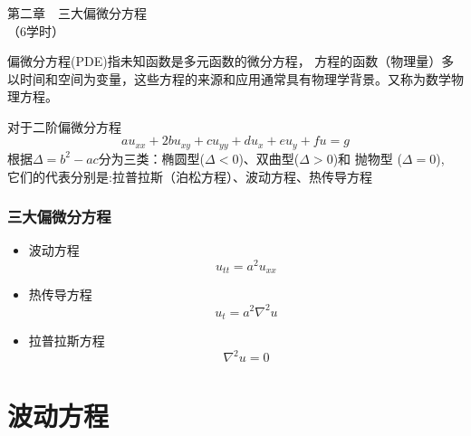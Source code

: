 	\begin{frame}
		\frametitle{}
	    \begin{center}
		{ {\Huge 第二章~~三大偏微分方程\\（6学时）}}
	    \end{center}    
	\end{frame}

\begin{frame}
	\begin{definition}[] 
	偏微分方程(PDE)指未知函数是多元函数的微分方程，
	方程的函数（物理量）多以时间和空间为变量，这些方程的来源和应用通常具有物理学背景。又称为数学物理方程。
	\end{definition}
	对于二阶偏微分方程
	\begin{equation*}
		au_{xx}+2bu_{xy}+cu_{yy}+du_x+eu_y+fu=g
	\end{equation*}
	根据$\Delta=b^2-ac$分为三类：椭圆型($\Delta<0$)、双曲型($\Delta>0$)和 抛物型 ($\Delta=0$),\\
	它们的代表分别是:拉普拉斯（泊松方程）、波动方程、热传导方程
\end{frame}

\begin{frame}
\frametitle{三大偏微分方程}
	\begin{itemize}
	\item  波动方程 
	\begin{equation*}
		u_{tt}=a^2u_{xx}
	\end{equation*}
	\item  热传导方程
	\begin{equation*}
		u_t=a^2 \nabla ^2 u 
	\end{equation*}
	\item  拉普拉斯方程
	\begin{equation*}
		 \nabla ^2 u =0
	\end{equation*}
	\end{itemize}
\end{frame}

\section{波动方程}
